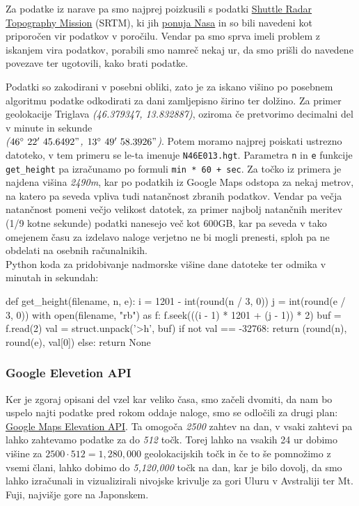 \documentclass[a4paper,11pt]{article}
\begin{document}
Za podatke iz narave pa smo najprej poizkusili s podatki \href{http://en.wikipedia.org/wiki/Shuttle_Radar_Topography_Mission}{\underline{Shuttle Radar Topography Mission}} (SRTM), ki jih \href{http://dds.cr.usgs.gov/srtm/version2_1/SRTM3/}{\underline{ponuja Nasa}} in so bili navedeni kot priporočen vir podatkov v poročilu. Vendar pa smo sprva imeli problem z iskanjem vira podatkov, porabili smo namreč nekaj ur, da smo prišli do navedene povezave ter ugotovili, kako brati podatke.
\par
Podatki so zakodirani v posebni obliki, zato je za iskano višino po posebnem algoritmu podatke odkodirati za dani zamljepisno širino ter dolžino. Za primer geolokacije Triglava \textit{(46.379347, 13.832887)}, oziroma če pretvorimo decimalni del v minute in sekunde \\
\textit{(\(46^{\circ}\ 22'\ 45.6492"\), \(13^{\circ}\ 49'\ 58.3926"\))}. Potem moramo najprej poiskati ustrezno datoteko, v tem primeru se le-ta imenuje \texttt{N46E013.hgt}. Parametra \texttt{n} in \texttt{e} funkcije \texttt{get\_height} pa izračunamo po formuli \texttt{min * 60 + sec}. Za točko iz primera je najdena višina \textit{2490m}, kar po podatkih iz Google Maps odstopa za nekaj metrov, na katero pa seveda vpliva tudi natančnost zbranih podatkov. Vendar pa večja natančnost pomeni večjo velikost datotek, za primer najbolj natančnih meritev (1/9 kotne sekunde) podatki nanesejo več kot 600GB, kar pa seveda v tako omejenem času za izdelavo naloge verjetno ne bi mogli prenesti, sploh pa ne obdelati na osebnih računalnikih.
\\
Python koda za pridobivanje nadmorske višine dane datoteke ter odmika v minutah in sekundah:
\begin{pythoncode}
  def get_height(filename, n, e):
    i = 1201 - int(round(n / 3, 0))
    j = int(round(e / 3, 0))
    with open(filename, "rb") as f:
      f.seek(((i - 1) * 1201 + (j - 1)) * 2)
      buf = f.read(2)
      val = struct.unpack('>h', buf)
      if not val == -32768:
        return (round(n), round(e), val[0])
      else:
        return None
\end{pythoncode}

\subsubsection{Google Elevetion API}

Ker je zgoraj opisani del vzel kar veliko časa, smo začeli dvomiti, da nam bo uspelo najti podatke pred rokom oddaje naloge, smo se odločili za drugi plan: \href{https://developers.google.com/maps/documentation/elevation/}{\underline{Google Maps Elevation API}}. Ta omogoča \textit{2500} zahtev na dan, v vsaki zahtevi pa lahko zahtevamo podatke za do \textit{512} točk. Torej lahko na vsakih 24 ur dobimo višine za \(2500 \cdot 512 = 1,280,000\) geolokacijskih točk in če to še pomnožimo z vsemi člani, lahko dobimo do \textit{5,120,000} točk na dan, kar je bilo dovolj, da smo lahko izračunali in vizualizirali nivojske krivulje za gori Uluru v Avstraliji ter Mt. Fuji, najvišje gore na Japonskem.
\end{document}

